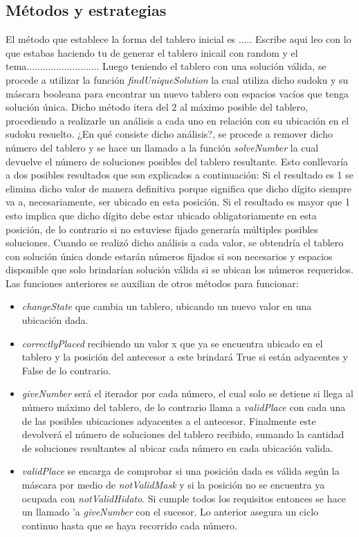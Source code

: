 \documentclass[10pt]{amsart}
\begin{document}
	\subsection*{M\'etodos y estrategias}
	El m\'etodo que establece la forma del tablero inicial es ..... Escribe aqui leo con lo que estabas haciendo tu de generar el tablero inicail con random y el tema...........................
	Luego teniendo el tablero con una soluci\'on v\'alida, se procede a utilizar la funci\'on \textit{findUniqueSolution} la cual utiliza dicho sudoku y su m\'ascara booleana para encontrar un nuevo tablero con espacios vac\'ios que tenga soluci\'on \'unica. Dicho m\'etodo itera del 2 al m\'aximo posible del tablero, procediendo a realizarle un an\'alisis a cada uno en relaci\'on con su ubicaci\'on en el sudoku resuelto. ¿En qu\'e consiste dicho an\'alisis?, se procede a remover dicho n\'umero del tablero y se hace un llamado a la funci\'on \textit{solveNumber} la cual devuelve el n\'umero de soluciones posibles del tablero resultante. Esto conllevar\'ia a dos posibles resultados que son explicados a continuaci\'on:
	 Si el resultado es 1 se elimina dicho valor de manera definitiva porque significa que dicho d\'igito siempre va a, necesariamente, ser ubicado en esta posici\'on.
	 Si el resultado es mayor que 1 esto implica que dicho d\'igito debe estar ubicado obligatoriamente en esta posici\'on, de lo contrario si no estuviese fijado generar\'ia m\'ultiples posibles soluciones.
	 Cuando se realiz\'o dicho an\'alisis a cada valor, se obtendr\'ia el tablero con soluci\'on \'unica donde estar\'an n\'umeros fijados si son necesarios y espacios disponible que solo brindar\'ian soluci\'on v\'alida si se ubican los n\'umeros requeridos.
	 Las funciones anteriores se auxilian de otros m\'etodos para funcionar:
	 
    \begin{itemize}
        \item \textit{changeState} que cambia un tablero, ubicando un nuevo valor en una ubicaci\'on dada.
        \item \textit{correctlyPlaced} recibiendo un valor x que ya se encuentra ubicado en el tablero y la posici\'on del antecesor a este brindar\'a True si est\'an adyacentes y False de lo contrario.
        \item \textit{giveNumber} ser\'a el iterador por cada n\'umero, el cual solo se detiene si llega al n\'umero m\'aximo del tablero, de lo contrario llama a \textit{validPlace} con cada una de las posibles ubicaciones adyacentes a el antecesor. Finalmente este devolver\'a el n\'umero de soluciones del tablero recibido, sumando la cantidad de soluciones resultantes al ubicar cada n\'umero en cada ubicaci\'on valida.  
		\item \textit{validPlace} se encarga de comprobar si una posici\'on dada es v\'alida seg\'un la m\'ascara por medio de \textit{notValidMask} y si la posici\'on no se encuentra ya ocupada con \textit{notValidHidato}. Si cumple todos los requisitos entonces se hace un llamado 'a \textit{giveNumber} con el sucesor. Lo anterior asegura un ciclo continuo hasta que se haya recorrido cada n\'umero.
    \end{itemize}
	 
\end{document}
